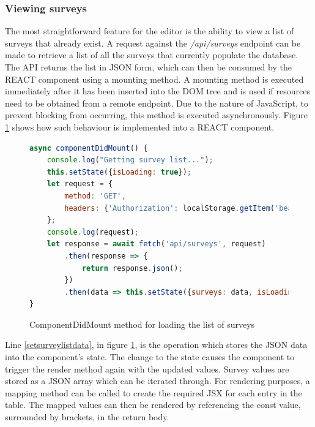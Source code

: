 \subsubsection*{Viewing surveys}

The most straightforward feature for the editor is the ability to view a list of surveys that already exist.
A request against the \textit{/api/surveys} endpoint can be made to retrieve a list of all the surveys that currently populate
the database.
The API returns the list in JSON form, which can then be consumed by the REACT component using a mounting method.
A mounting method is executed immediately after it has been inserted into the DOM tree and is used if resources need to be obtained
from a remote endpoint.
Due to the nature of JavaScript, to prevent blocking from occurring, this method is executed asynchronously.
Figure \ref{serverlistcomponentmount} shows how such behaviour is implemented into a REACT component. 

\begin{figure}[ht]
    \centering
    \begin{lstlisting}[language=Javascript, escapechar=|]
async componentDidMount() {
    console.log("Getting survey list...");
    this.setState({isLoading: true});
    let request = {
        method: 'GET',
        headers: {'Authorization': localStorage.getItem('bearer')},
    };
    console.log(request);
    let response = await fetch('api/surveys', request)
        .then(response => {
            return response.json();
        })
        .then(data => this.setState({surveys: data, isLoading: false})); |\label{setsurveylistdata}|
}
    \end{lstlisting}
    \caption{ComponentDidMount method for loading the list of surveys}
    \label{serverlistcomponentmount}
\end{figure}

Line \ref{setsurveylistdata}, in figure \ref{serverlistcomponentmount}, is the operation which stores the JSON data into the component's state.
The change to the state causes the component to trigger the render method again with the updated values.
Survey values are stored as a JSON array which can be iterated through.
For rendering purposes, a mapping method can be called to create the required JSX for each entry in the table.
The mapped values can then be rendered by referencing the const value, surrounded by brackets, in the return body.

